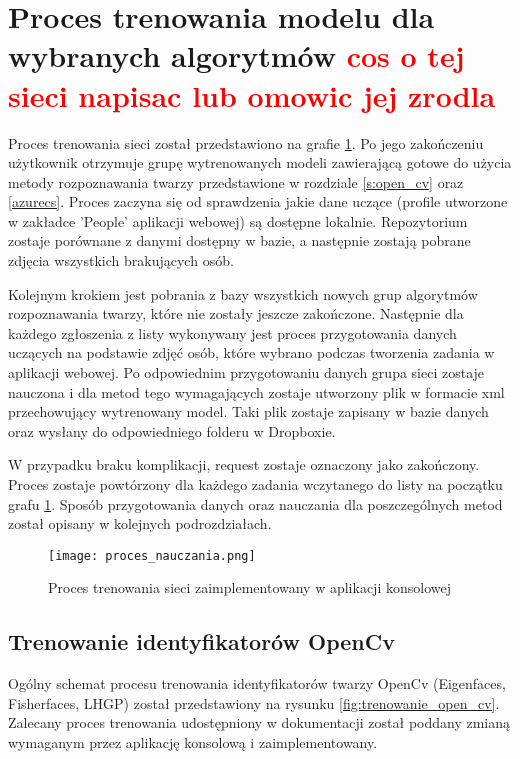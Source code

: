 \section{Proces trenowania modelu dla wybranych algorytmów \textcolor{red}{cos o tej sieci napisac lub omowic jej zrodla}}
Proces trenowania sieci został przedstawiono na grafie \ref{fig:trenowanie_proces}. Po jego zakończeniu użytkownik otrzymuje grupę wytrenowanych modeli zawierającą gotowe do użycia metody rozpoznawania twarzy przedstawione w rozdziale \ref{s:open_cv} oraz \ref{azurecs}.
Proces zaczyna się od sprawdzenia jakie dane uczące (profile utworzone w zakładce 'People' aplikacji webowej) są dostępne lokalnie. Repozytorium zostaje porównane z danymi dostępny w bazie, a następnie zostają pobrane zdjęcia wszystkich brakujących osób.

Kolejnym krokiem jest pobrania z bazy wszystkich nowych grup algorytmów rozpoznawania twarzy, które nie zostały jeszcze zakończone. Następnie dla każdego zgłoszenia z listy wykonywany jest proces przygotowania danych uczących na podstawie zdjęć osób, które wybrano podczas tworzenia zadania w aplikacji webowej. Po odpowiednim przygotowaniu danych grupa sieci zostaje nauczona i dla metod tego wymagających zostaje utworzony plik w formacie xml przechowujący wytrenowany model. Taki plik zostaje zapisany w bazie danych oraz wysłany do odpowiedniego folderu w Dropboxie.

W przypadku braku komplikacji, request zostaje oznaczony jako zakończony. Proces zostaje powtórzony dla każdego zadania wczytanego do listy na początku grafu \ref{fig:trenowanie_proces}. Sposób przygotowania danych oraz nauczania dla poszczególnych metod został opisany w kolejnych podrozdziałach.
\begin{figure}[H]
	\centering
	\texttt{[image: proces\_nauczania.png]}
	\caption{Proces trenowania sieci zaimplementowany w aplikacji konsolowej}
	\label{fig:trenowanie_proces}
\end{figure}

\subsection{Trenowanie identyfikatorów OpenCv} \label{trenowanie_open_cv}
Ogólny schemat procesu trenowania identyfikatorów twarzy OpenCv (Eigenfaces, Fisherfaces, LHGP) został przedstawiony na rysunku \ref{fig:trenowanie_open_cv}. Zalecany proces trenowania udostępniony w dokumentacji \cite{opencv_doc} został poddany zmianą wymaganym przez aplikację konsolową i zaimplementowany.

